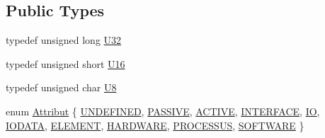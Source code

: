 \subsection*{Public Types}
\begin{DoxyCompactItemize}
\item 
typedef unsigned long \hyperlink{classUsbSpiBus_a9b24e28662a35ca57f5ed32c41c5f3ff}{U32}
\item 
typedef unsigned short \hyperlink{classUsbSpiBus_a741e3c698b080973693ceb990017a560}{U16}
\item 
typedef unsigned char \hyperlink{classUsbSpiBus_a11336f4ad104fbd4fb454be044f19fc8}{U8}
\item 
enum \hyperlink{classAttrib_a69e171d7cc6417835a5a306d3c764235}{Attribut} \{ \newline
\hyperlink{classAttrib_a69e171d7cc6417835a5a306d3c764235a3a8da2ab97dda18aebab196fe4100531}{U\+N\+D\+E\+F\+I\+N\+ED}, 
\hyperlink{classAttrib_a69e171d7cc6417835a5a306d3c764235a2bfb2af57b87031d190a05fe25dd92ed}{P\+A\+S\+S\+I\+VE}, 
\hyperlink{classAttrib_a69e171d7cc6417835a5a306d3c764235a3b1fec929c0370d1436f2f06e298fb0d}{A\+C\+T\+I\+VE}, 
\hyperlink{classAttrib_a69e171d7cc6417835a5a306d3c764235aa27c16b480a369ea4d18b07b2516bbc7}{I\+N\+T\+E\+R\+F\+A\+CE}, 
\newline
\hyperlink{classAttrib_a69e171d7cc6417835a5a306d3c764235a1420a5b8c0540b2af210b6975eded7f9}{IO}, 
\hyperlink{classAttrib_a69e171d7cc6417835a5a306d3c764235a0af3b0d0ac323c1704e6c69cf90add28}{I\+O\+D\+A\+TA}, 
\hyperlink{classAttrib_a69e171d7cc6417835a5a306d3c764235a7788bc5dd333fd8ce18562b269c9dab1}{E\+L\+E\+M\+E\+NT}, 
\hyperlink{classAttrib_a69e171d7cc6417835a5a306d3c764235a61ceb22149f365f1780d18f9d1459423}{H\+A\+R\+D\+W\+A\+RE}, 
\newline
\hyperlink{classAttrib_a69e171d7cc6417835a5a306d3c764235a75250e29692496e73effca2c0330977f}{P\+R\+O\+C\+E\+S\+S\+US}, 
\hyperlink{classAttrib_a69e171d7cc6417835a5a306d3c764235a103a67cd0b8f07ef478fa45d4356e27b}{S\+O\+F\+T\+W\+A\+RE}
 \}
\end{DoxyCompactItemize}
